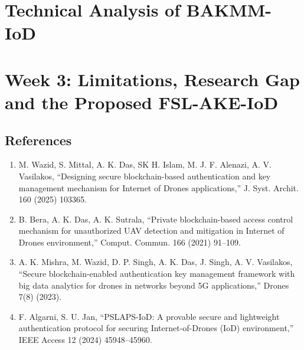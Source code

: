 \documentclass[11pt,a4paper]{article}
\begin{document}
\section{Technical Analysis of BAKMM-IoD}


\section{Week 3: Limitations, Research Gap and the Proposed FSL-AKE-IoD}


\subsection*{References}
\begin{enumerate}
\item[{[1]}] M. Wazid, S. Mittal, A. K. Das, SK H. Islam, M. J. F. Alenazi, A. V. Vasilakos, ``Designing secure
blockchain-based authentication and key management mechanism for Internet of Drones applications,''
J. Syst. Archit. 160 (2025) 103365.
\item[{[2]}] B. Bera, A. K. Das, A. K. Sutrala, ``Private blockchain-based access control mechanism for unauthorized UAV
detection and mitigation in Internet of Drones environment,'' Comput. Commun. 166 (2021) 91--109.
\item[{[3]}] A. K. Mishra, M. Wazid, D. P. Singh, A. K. Das, J. Singh, A. V. Vasilakos, ``Secure blockchain-enabled
authentication key management framework with big data analytics for drones in networks beyond 5G applications,''
Drones 7(8) (2023).
\item[{[4]}] F. Algarni, S. U. Jan, ``PSLAPS-IoD: A provable secure and lightweight authentication protocol for securing
Internet-of-Drones (IoD) environment,'' IEEE Access 12 (2024) 45948--45960.
\end{enumerate}
\end{document}
